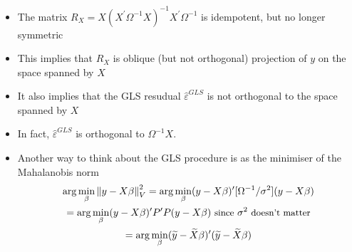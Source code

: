 \documentclass[notes=show]{beamer}
\begin{document}
\begin{frame}%


\begin{itemize}
\item The matrix $R_{X}=X(X^{\prime }\Omega ^{-1}X)^{-1}X^{\prime }\Omega
^{-1}$ is idempotent, but no longer symmetric

\item This implies that $R_{X}$ is oblique (but not orthogonal) projection
of $y$ on the space spanned by $X$

\item It also implies that the GLS resudual $\widehat{\varepsilon }^{GLS}$
is not orthogonal to the space spanned by $X$

\item In fact, $\widehat{\varepsilon }^{GLS}$ is orthogonal to $\Omega
^{-1}X.$

\item Another way to think about the GLS procedure is as the minimiser of
the Mahalanobis norm%
\begin{gather*}
\arg \min_{\beta }\left\Vert y-X\beta \right\Vert _{V}^{2}=\arg \min_{\beta
}(y-X\beta )^{\prime }[\Omega ^{-1}/\sigma ^{2}](y-X\beta ) \\
=\arg \min_{\beta }(y-X\beta )^{\prime }P^{\prime }P(y-X\beta )\text{ 
{\small since} }{\small \sigma }^{2}\text{ {\small doesn't matter}} \\
=\arg \min_{\beta }(\widetilde{y}-\widetilde{X}\beta )^{\prime }(\widetilde{y%
}-\widetilde{X}\beta )
\end{gather*}
\end{itemize}

\end{frame}%
\end{document}

